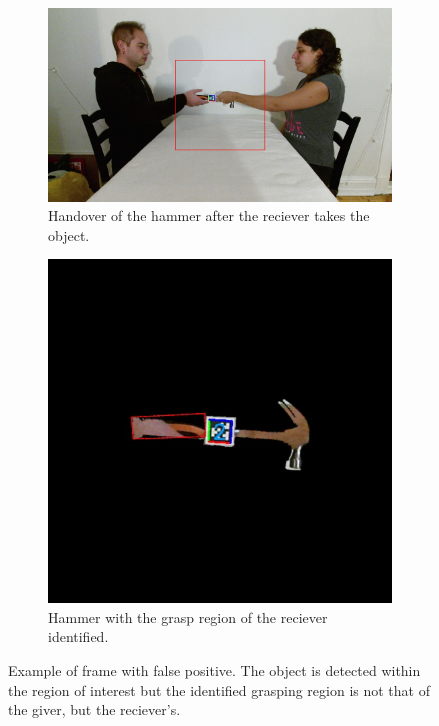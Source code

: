 \begin{figure}
	\centering
	\begin{subfigure}[b]{\textwidth}
		\centering
		\includegraphics[width=\textwidth]{img/methods/handovers/incorr_frame.jpg}
		\caption{Handover of the hammer after the reciever takes the object.}
		\label{fig:demo_handover_incorr}
	\end{subfigure}
	\par\bigskip
	\begin{subfigure}[b]{0.5\textwidth}
		\centering
		\includegraphics[width=\textwidth]{img/methods/handovers/incorr_mask.jpg}
		\caption{Hammer with the grasp region of the reciever identified.}
		\label{fig:handover_incorr_masked}
	\end{subfigure}
	\caption{Example of frame with false positive. The object is detected within the region of interest but the identified grasping region is not that of the giver, but the reciever's.}
	\label{fig:handover_incorr}
\end{figure}


